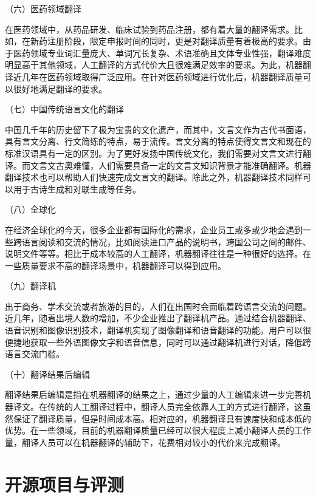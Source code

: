 \parinterval （六）医药领域翻译

\parinterval 在医药领域中，从药品研发、临床试验到药品注册，都有着大量的翻译需求。比如，在新药注册阶段，限定申报时间的同时，更是对翻译质量有着极高的要求。由于医药领域专业词汇量庞大、单词冗长复杂、术语准确且文体专业性强，翻译难度明显高于其他领域，人工翻译的方式代价大且很难满足效率的要求。为此，机器翻译近几年在医药领域取得广泛应用。在针对医药领域进行优化后，机器翻译质量可以很好地满足翻译的要求。

\parinterval （七）中国传统语言文化的翻译

\parinterval 中国几千年的历史留下了极为宝贵的文化遗产，而其中，文言文作为古代书面语，具有言文分离、行文简练的特点，易于流传。言文分离的特点使得文言文和现在的标准汉语具有一定的区别。为了更好发扬中国传统文化，我们需要对文言文进行翻译。而文言文古奥难懂，人们需要具备一定的文言文知识背景才能准确翻译。机器翻译技术也可以帮助人们快速完成文言文的翻译。除此之外，机器翻译技术同样可以用于古诗生成和对联生成等任务。

\parinterval （八）全球化

\parinterval 在经济全球化的今天，很多企业都有国际化的需求，企业员工或多或少地会遇到一些跨语言阅读和交流的情况，比如阅读进口产品的说明书，跨国公司之间的邮件、说明文件等等。相比于成本较高的人工翻译，机器翻译往往是一种很好的选择。在一些质量要求不高的翻译场景中，机器翻译可以得到应用。

\parinterval （九）翻译机

\parinterval 出于商务、学术交流或者旅游的目的，人们在出国时会面临着跨语言交流的问题。近几年，随着出境人数的增加，不少企业推出了翻译机产品。通过结合机器翻译、语音识别和图像识别技术，翻译机实现了图像翻译和语音翻译的功能。用户可以很便捷地获取一些外语图像文字和语音信息，同时可以通过翻译机进行对话，降低跨语言交流门槛。

\parinterval （十）翻译结果后编辑

\parinterval 翻译结果后编辑是指在机器翻译的结果之上，通过少量的人工编辑来进一步完善机器译文。在传统的人工翻译过程中，翻译人员完全依靠人工的方式进行翻译，这虽然保证了翻译质量，但是时间成本高。相对应的，机器翻译具有速度快和成本低的优势。在一些领域，目前的机器翻译质量已经可以很大程度上减小翻译人员的工作量，翻译人员可以在机器翻译的辅助下，花费相对较小的代价来完成翻译。


\sectionnewpage
\section{开源项目与评测}

